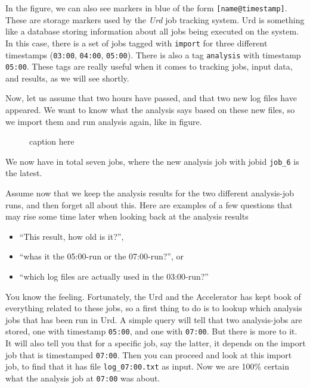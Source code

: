 \documentclass[a4paper]{article}
\begin{document}
In the figure, we can also see markers in blue of the form
\texttt{[name@timestamp]}.  These are storage markers used by the
\textsl{Urd} job tracking system.  Urd is something like a database
storing information about all jobs being executed on the system.  In
this case, there is a set of jobs tagged with \texttt{import} for
three different timestamps (\texttt{03:00}, \texttt{04:00},
\texttt{05:00}).  There is also a tag \texttt{analysis} with timestamp
\texttt{05:00}.  These tags are really useful when it comes to
tracking jobs, input data, and results, as we will see shortly.

Now, let us assume that two hours have passed, and that two new log
files have appeared.  We want to know what the analysis says based on
these new files, so we import them and run analysis again, like in
figure.
\begin{figure}[h!]
  \begin{center}
    
    \caption{caption here}
    \label{figure:example}
  \end{center}
\end{figure}
We now have in total seven jobs, where the new analysis job with jobid
\texttt{job\_6} is the latest.

Assume now that we keep the analysis results for the two different
analysis-job runs, and then forget all about this.  Here are examples
of a few questions that may rise some time later when looking back at
the analysis results

\begin{itemize}
\item[]``This result, how old is it?'',
\item[] ``whas it the 05:00-run or the 07:00-run?'', or
\item[] ``which log files are actually used in the 03:00-run?''
\end{itemize}

You know the feeling.  Fortunately, the Urd and the Accelerator has
kept book of everything related to these jobs, so a first thing to do
is to lookup which analysis jobs that has been run in Urd.  A simple
query will tell that two analysis-jobs are stored, one with timestamp
\texttt{05:00}, and one with \texttt{07:00}.  But there is more to it.
It will also tell you that for a specific job, say the latter, it
depends on the import job that is timestamped \texttt{07:00}.  Then
you can proceed and look at this import job, to find that it has file
\texttt{log\_07:00.txt} as input.  Now we are 100\% certain what the
analysis job at \texttt{07:00} was about.
\end{document}
